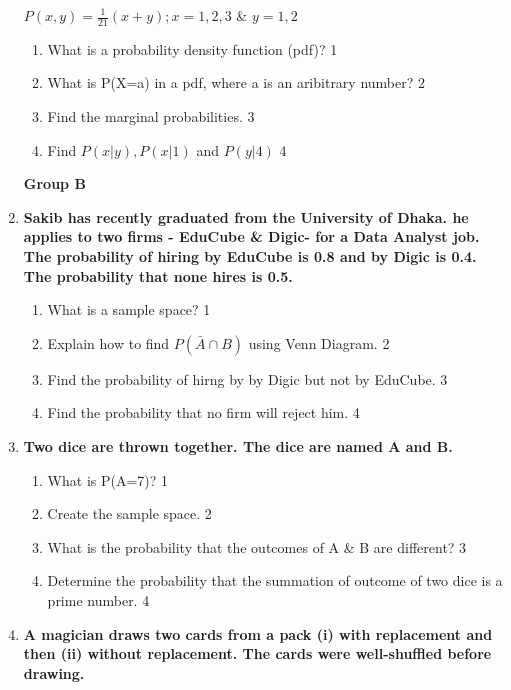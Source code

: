 \documentclass{article}
\begin{document}
\begin{enumerate}
$P(x,y) = \frac{1}{21}(x+y); x=1,2,3$ \& $y = 1,2$ 
  
  \begin{enumerate}
    \item
	What is a probability density function (pdf)? \hfill 1
    \item
	What is P(X=a) in a pdf, where a is an aribitrary number? \hfill 2
    \item  
	Find the marginal probabilities. \hfill 3
    \item
	Find $P(x \vert y), P(x \vert 1)$ and $P(y|4)$ \hfill 4
  \end{enumerate}
 
\begin{center}
\textbf{Group B}
\end{center}

 \item
  \textbf{Sakib has recently graduated from the University of Dhaka. he applies to two firms - EduCube \& Digic- for a Data Analyst job. The probability of hiring by EduCube is 0.8 and by Digic is 0.4. The probability that none hires is 0.5.} 
  
  \begin{enumerate}
    \item
	What is a sample space? \hfill 1
    \item
	Explain how to find $P(\bar A \cap B)$ using Venn Diagram. \hfill 2
    \item  
	Find the probability of hirng by by Digic but not by EduCube. \hfill 3
    \item
	Find the probability that no firm will reject him. \hfill 4
  \end{enumerate}

 \item
	  \textbf{Two dice are thrown together. The dice are named A and B.} 
  
  \begin{enumerate}
    \item
	What is P(A=7)? \hfill 1
    \item
	Create the sample space. \hfill 2
    \item  
	What is the probability that the outcomes of A \& B are different? \hfill 3
    \item
	Determine the probability that the summation of outcome of two dice is a prime number. \hfill 4
  \end{enumerate}

 \item
	  \textbf{A magician draws two cards from a pack (i) with replacement and then (ii) without replacement. The cards were well-shuffled before drawing.} 
  

\end{enumerate}
\end{document}
